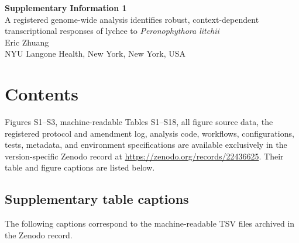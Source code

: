 \documentclass[12pt]{article}
\begin{document}
\begin{center}
{\Large\bfseries Supplementary Information 1}\\[1.2em]
{\large A registered genome-wide analysis identifies robust, context-dependent transcriptional responses of lychee to \textit{Peronophythora litchii}}\\[1.2em]
Eric Zhuang\\
NYU Langone Health, New York, New York, USA
\end{center}

\section*{Contents}

Figures S1--S3, machine-readable Tables S1--S18, all figure source data, the registered protocol and amendment log, analysis code, workflows, configurations, tests, metadata, and environment specifications are available exclusively in the version-specific Zenodo record at \url{https://zenodo.org/records/22436625}. Their table and figure captions are listed below.

\subsection*{Supplementary table captions}

The following captions correspond to the machine-readable TSV files archived in the Zenodo record.
\end{document}
